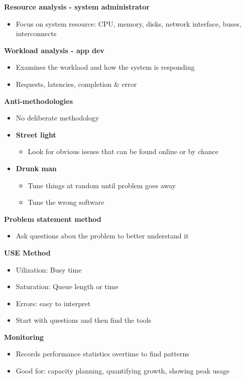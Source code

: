 \documentclass[10pt, landscape]{article}
\begin{document}
\begin{multicols}{4}
\textbf{Resource analysis - system administrator}
\begin{itemize}
    \item Focus on system resource: CPU, memory, disks, network interface, buses, interconnects 
\end{itemize}


\textbf{Workload analysis - app dev}
\begin{itemize}
    \item Examines the worklaod and how the system is responding
    \item Requests, latencies, completion \& error 
\end{itemize}


\textbf{Anti-methodologies}
\begin{itemize}
    \item No deliberate methodology
    \item \textbf{Street light}
    \begin{itemize}
        \item Look for obvious issues that can be found online or by chance 
    \end{itemize}
    \item \textbf{Drunk man}
    \begin{itemize}
        \item Tune things at random until problem goes away
        \item Tune the wrong software
    \end{itemize}
\end{itemize}

\textbf{Problem statement method}
\begin{itemize}
    \item Ask questions abou the problem to better understand it
\end{itemize}

\textbf{USE Method}
\begin{itemize}
    \item Uilization: Busy time 
    \item Saturation: Queue length or time 
    \item Errors: easy to interpret
    \item Start with questions and then find the tools 
\end{itemize}

\textbf{Monitoring}
\begin{itemize}
    \item Records performance statistics overtime to find patterns 
    \item Good for: capacity planning, quantifying growth, showing peak usage 
\end{itemize}



\end{multicols}
\end{document}

